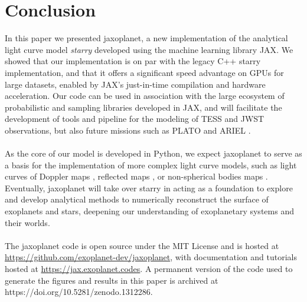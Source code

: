 \documentclass[modern]{aastex631}
\begin{document}
\section{Conclusion}
In this paper we presented \textsf{jaxoplanet}, a new implementation of the analytical light curve model \textit{starry} developed using the machine learning library \textsf{JAX}. We showed that our implementation is on par with the legacy C++ \textsf{starry} implementation, and that it offers a significant speed advantage on GPUs for large datasets, enabled by \textsf{JAX}'s just-in-time compilation and hardware acceleration. Our code can be used in association with the large ecosystem of probabilistic and sampling libraries developed in \textsf{JAX}, and will facilitate the development of tools and pipeline for the modeling of TESS and JWST observations, but also future missions such as PLATO \citep{Rauer2014} and ARIEL \citep{Tinetti2018}.\\\\
As the core of our model is developed in Python, we expect \textsf{jaxoplanet} to serve as a basis for the implementation of more complex light curve models, such as light curves of Doppler maps \citep{Luger2021c}, reflected maps \citep{Luger2022}, or non-spherical bodies maps \citep{Dholakia2024}. Eventually, \textsf{jaxoplanet} will take over \textsf{starry} in acting as a foundation to explore and develop analytical methods to numerically reconstruct the surface of exoplanets and stars, deepening our understanding of exoplanetary systems and their worlds.\\\\
The \textsf{jaxoplanet} code is open source under the MIT License and is hosted at \href{https://github.com/exoplanet-dev/jaxoplanet/}{https://github.com/exoplanet-dev/jaxoplanet}, with documentation and tutorials hosted at \href{https://jax.exoplanet.codes}{https://jax.exoplanet.codes}. A permanent version of the code used to generate the figures and results in this paper is archived at https://doi.org/10.5281/zenodo.1312286.



\appendix
\end{document}
